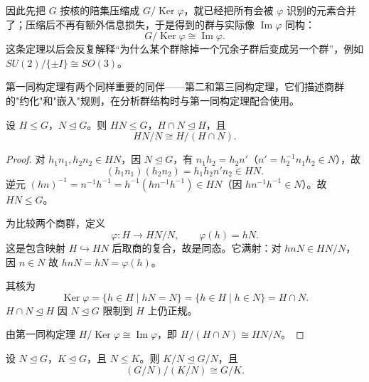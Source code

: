 因此先把 $G$ 按核的陪集压缩成 $G/\operatorname{Ker}\varphi$，就已经把所有会被 $\varphi$ 识别的元素合并了；压缩后不再有额外信息损失，于是得到的群与实际像 $\operatorname{Im}\varphi$ 同构：
\[
G/\operatorname{Ker}\varphi\cong\operatorname{Im}\varphi.
\]
这条定理以后会反复解释“为什么某个群除掉一个冗余子群后变成另一个群”，例如 $SU(2)/\{\pm I\}\cong SO(3)$。

第一同构定理有两个同样重要的同伴——第二和第三同构定理，它们描述商群的"约化"和"嵌入"规则，在分析群结构时与第一同构定理配合使用。

\begin{theorem}[第二同构定理]
\label{thm:second-isomorphism}
设 $H\le G$，$N\mathrel{\trianglelefteq} G$。则 $HN\le G$，$H\cap N\mathrel{\trianglelefteq} H$，且
\begin{equation}
HN/N\cong H/(H\cap N).
\label{eq:second-isomorphism}
\end{equation}

\end{theorem}

\begin{proof}
对 $h_1n_1,h_2n_2\in HN$，因 $N\mathrel{\trianglelefteq} G$，有 $n_1h_2=h_2 n'$（$n'=h_2^{-1}n_1h_2\in N$），故
\[
(h_1n_1)(h_2n_2)=h_1h_2 n'n_2\in HN.
\]
逆元 $(hn)^{-1}=n^{-1}h^{-1}=h^{-1}(h n^{-1}h^{-1})\in HN$（因 $h n^{-1}h^{-1}\in N$）。故 $HN\le G$。

为比较两个商群，定义
\[
\varphi:H\to HN/N,\qquad\varphi(h)=hN.
\]
这是包含映射 $H\hookrightarrow HN$ 后取商的复合，故是同态。它满射：对 $hnN\in HN/N$，因 $n\in N$ 故 $hnN=hN=\varphi(h)$。

其核为
\[
\operatorname{Ker}\varphi=\{h\in H\mid hN=N\}=\{h\in H\mid h\in N\}=H\cap N.
\]
$H\cap N\mathrel{\trianglelefteq} H$ 因 $N\mathrel{\trianglelefteq} G$ 限制到 $H$ 上仍正规。

由第一同构定理 $H/\operatorname{Ker}\varphi\cong\operatorname{Im}\varphi$，即 $H/(H\cap N)\cong HN/N$。
\end{proof}

\begin{theorem}[第三同构定理]
\label{thm:third-isomorphism}
设 $N\mathrel{\trianglelefteq} G$，$K\mathrel{\trianglelefteq} G$，且 $N\le K$。则 $K/N\mathrel{\trianglelefteq} G/N$，且
\begin{equation}
(G/N)/(K/N)\cong G/K.
\label{eq:third-isomorphism}
\end{equation}

\end{theorem}

